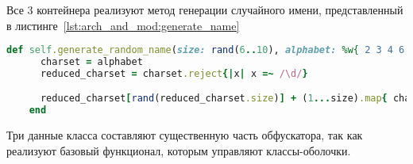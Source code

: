 Все 3 контейнера реализуют метод генерации случайного имени, представленный в листинге~\ref{lst:arch_and_mod:generate_name}
  \begin{lstlisting}[language=Ruby, style=rubystyle,caption={Вспомогательные метод stringified для символьных литералов}, label=lst:arch_and_mod:generate_name]
    def self.generate_random_name(size: rand(6..10), alphabet: %w{ 2 3 4 6 7 9 A C D E F G H J K M N P Q R T V W X Y Z})
      charset = alphabet
      reduced_charset = charset.reject{|x| x =~ /\d/}

      reduced_charset[rand(reduced_charset.size)] + (1...size).map{ charset.to_a[rand(charset.size)] }.join
    end
  \end{lstlisting}
Три данные класса составляют существенную часть обфускатора, так как реализуют базовый функционал, которым управляют классы-оболочки.




